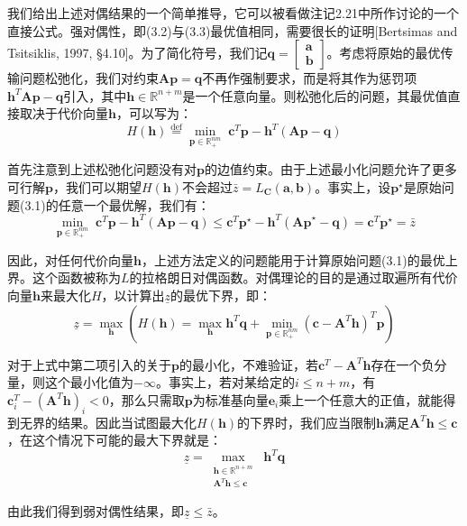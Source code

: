 \documentclass[cn,10pt,math=newtx,citestyle=gb7714-2015,bibstyle=gb7714-2015]{elegantbook}
\begin{document}
\begin{postulate}
我们给出上述对偶结果的一个简单推导，它可以被看做注记2.21中所作讨论的一个直接公式。强对偶性，即(3.2)与(3.3)最优值相同，需要很长的证明[Bertsimas and Tsitsiklis, 1997, \S 4.10]。为了简化符号，我们记$\mathbf{q}=\begin{bmatrix}\mathbf{a}\\ \mathbf{b}\end{bmatrix}$。考虑将原始的最优传输问题松弛化，我们对约束$\mathbf{Ap=q}$不再作强制要求，而是将其作为惩罚项$\mathbf{h}^T\mathbf{Ap-q}$引入，其中$\mathbf{h}\in\mathbb{R}^{n+m}$是一个任意向量。则松弛化后的问题，其最优值直接取决于代价向量$\mathbf{h}$，可以写为：
\begin{equation*}
    H(\mathbf{h})\overset{\text{def}}{=} \min\limits_{\mathbf{p}\in\mathbb{R}^{nm}_+} \; \mathbf{c}^T\mathbf{p}-\mathbf{h}^T(\mathbf{Ap-q})
\end{equation*}

首先注意到上述松弛化问题没有对$\mathbf{p}$的边值约束。由于上述最小化问题允许了更多可行解$\mathbf{p}$，我们可以期望$H(\mathbf{h})$不会超过$\bar z=L_\mathbf{C}(\mathbf{a,b})$。事实上，设$\mathbf{p}^\star$是原始问题(3.1)的任意一个最优解，我们有：
\begin{equation*}
    \min\limits_{\mathbf{p}\in\mathbb{R}^{nm}_+} \; \mathbf{c}^T\mathbf{p}-\mathbf{h}^T(\mathbf{Ap-q}) \leq \mathbf{c}^T\mathbf{p}^\star-\mathbf{h}^T(\mathbf{Ap}^\star-\mathbf{q})=\mathbf{c}^T\mathbf{p}^\star=\bar z
\end{equation*}

因此，对任何代价向量$\mathbf{h}$，上述方法定义的问题能用于计算原始问题(3.1)的最优上界。这个函数被称为$L$的拉格朗日对偶函数。对偶理论的目的是通过取遍所有代价向量$\mathbf{h}$来最大化$H$，以计算出$\underline{z}$的最优下界，即：
\begin{equation*}
    \underline{z}=\max\limits_{\mathbf{h}} \left( H(\mathbf{h})=\max\limits_{\mathbf{h}}\mathbf{h}^T\mathbf{q} + \min\limits_{\mathbf{p}\in\mathbb{R}^{nm}_+}(\mathbf{c}-\mathbf{A}^T\mathbf{h})^T\mathbf{p} \right)
\end{equation*}

对于上式中第二项引入的关于$\mathbf{p}$的最小化，不难验证，若$\mathbf{c}^T-\mathbf{A}^T\mathbf{h}$存在一个负分量，则这个最小化值为$-\infty$。事实上，若对某给定的$i\leq n+m$，有$\mathbf{c}^T_i-(\mathbf{A}^T\mathbf{h})_i<0$，那么只需取$\mathbf{p}$为标准基向量$\mathbf{e}_i$乘上一个任意大的正值，就能得到无界的结果。因此当试图最大化$H(\mathbf{h})$的下界时，我们应当限制$\mathbf{h}$满足$\mathbf{A}^T\mathbf{h}\leq \mathbf{c}$，在这个情况下可能的最大下界就是：
\begin{equation*}
    \underline{z}=\max\limits_{\begin{array}{c}\mathbf{h}\in\mathbb{R}^{n+m}\\ \mathbf{A}^T\mathbf{h}\leq \mathbf{c}\end{array}}\; \mathbf{h}^T\mathbf{q}
\end{equation*}

由此我们得到弱对偶性结果，即$\underline{z}\leq \bar{z}$。
\end{postulate}
\end{document}
